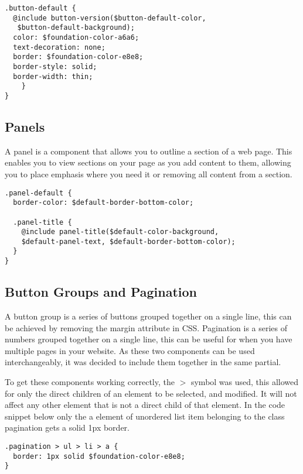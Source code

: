 \begin{lstlisting}[language=CSS3]
.button-default {
  @include button-version($button-default-color,
   $button-default-background);
  color: $foundation-color-a6a6;
  text-decoration: none;
  border: $foundation-color-e8e8;
  border-style: solid;
  border-width: thin;
	}
}
\end{lstlisting}

\subsection*{Panels}
A panel is a component that allows you to outline a section of a web page. This enables you to view sections on your page as you add content to them, allowing you to place emphasis where you need it or removing all content from a section. 

\begin{lstlisting}[language=CSS3]
.panel-default {
  border-color: $default-border-bottom-color;

  .panel-title {
    @include panel-title($default-color-background, 
    $default-panel-text, $default-border-bottom-color);
  }
}
\end{lstlisting}

\newpage
\subsection*{Button Groups and Pagination}
A button group is a series of buttons grouped together on a single line, this can be achieved by removing the margin attribute in CSS. Pagination is a series of numbers grouped together on a single line, this can be useful for when you have multiple pages in your website. As these two components can be used interchangeably, it was decided to include them together in the same partial.

To get these components working correctly, the $>$ symbol was used, this allowed for only the direct children of an element to be selected, and modified. It will not affect any other element that is not a direct child of that element. In the code snippet below only the a element of unordered list item belonging to the class pagination gets a solid 1px border.   

\begin{lstlisting}[language=CSS3]
.pagination > ul > li > a {
  border: 1px solid $foundation-color-e8e8;
}
\end{lstlisting}

